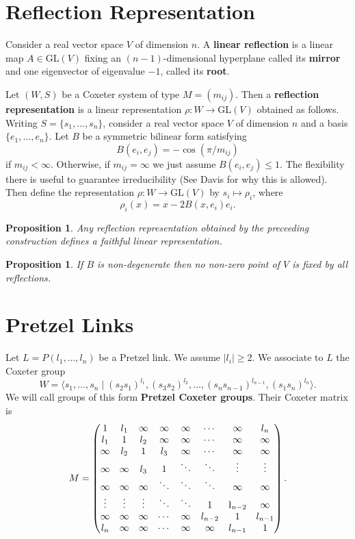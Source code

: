 \documentclass[11pt]{article}
\newtheorem{proposition}[theorem]{Proposition}
\begin{document}
\section{Reflection Representation}
Consider a real vector space $V$ of dimension $n$. A \textbf{linear reflection} is a linear map $A \in \text{GL}(V)$ fixing an $(n-1)$-dimensional hyperplane called its \textbf{mirror} and one eigenvector of eigenvalue $-1$, called its \textbf{root}.

Let $(W,S)$ be a Coxeter system of type $M = (m_{ij})$. Then a \textbf{reflection representation} is a linear representation $\rho: W \rightarrow \text{GL}(V)$ obtained as follows.
Writing $S = \{s_1,\dots,s_n\}$, consider a real vector space $V$ of dimension $n$ and a basis $\{e_1,\dots,e_n\}$. Let $B$ be a symmetric bilinear form satisfying
$$B(e_i, e_j) = -\cos(\pi/m_{ij})$$
if $m_{ij} < \infty$. Otherwise, if $m_{ij} = \infty$ we just assume $B(e_i, e_j) \leq 1.$ The flexibility there is useful to guarantee irreducibility (See Davis for why this is allowed). Then define the representation $\rho: W \rightarrow \text{GL}(V)$ by $s_i \mapsto \rho_i$, where
$$\rho_i(x) = x - 2B(x, e_i)e_i.$$
\begin{proposition}
Any reflection representation obtained by the preceeding construction defines a faithful linear representation.
\end{proposition}


\begin{proposition}
If $B$ is non-degenerate then no non-zero point of $V$ is fixed by all reflections.
\end{proposition}

\section{Pretzel Links}
Let $L = P(l_1,\dots, l_n)$ be a Pretzel link. We assume $|l_i| \geq 2$. We associate to $L$ the Coxeter group
$$W = \langle s_1, \dots, s_n \; | \; (s_2s_1)^{l_1}, (s_3s_2)^{l_2}, \dots, (s_ns_{n-1})^{l_{n-1}}, (s_1s_n)^{l_n} \rangle.$$
We will call groups of this form \textbf{Pretzel Coxeter groups}. Their Coxeter matrix is
$$M = \left( \begin{matrix}
1 & l_1 & \infty & \infty & \infty &\cdots & \infty & l_n \\
l_1 & 1 & l_2 & \infty & \infty & \cdots & \infty & \infty \\
\infty & l_2 & 1 & l_3 & \infty &\cdots & \infty & \infty \\
\infty & \infty  & l_3 & 1 & \ddots & \ddots & \vdots & \vdots \\
\infty & \infty & \infty & \ddots & \ddots & \ddots & \infty & \infty \\
\vdots & \vdots & \vdots & \ddots &\ddots & 1 & \l_{n-2} & \infty \\
\infty & \infty & \infty & \cdots & \infty & l_{n-2} & 1 & l_{n-1} \\
l_n & \infty & \infty & \cdots & \infty & \infty  & l_{n-1} & 1
\end{matrix} \right).$$
\end{document}
